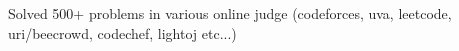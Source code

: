 \begin{zitemize}
\item Solved 500+ problems in various online judge (codeforces, uva, leetcode, uri/beecrowd, codechef, lightoj etc...)
\end{zitemize}